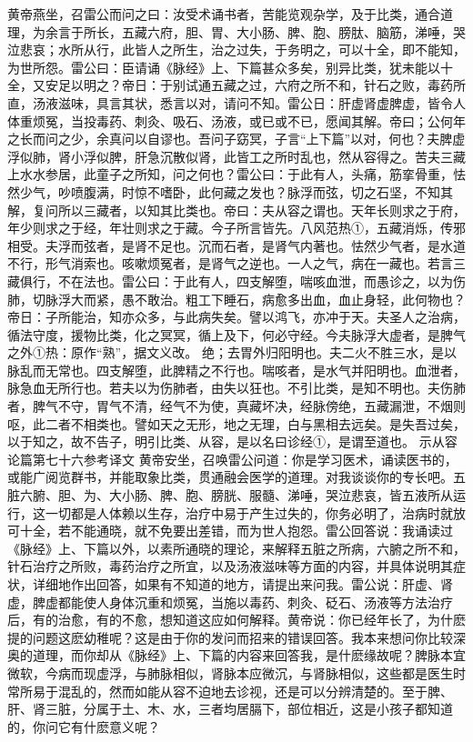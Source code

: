 \documentclass[a4paper,12pt,UTF8,twoside]{ctexbook}
\begin{document}
黄帝燕坐，召雷公而问之曰：汝受术诵书者，苦能览观杂学，及于比类，通合道理，为余言于所长，五藏六府，胆、胃、大小肠、脾、胞、膀肽、脑筋，涕唾，哭泣悲哀；水所从行，此皆人之所生，治之过失，于务明之，可以十全，即不能知，为世所怨。雷公曰：臣请诵《脉经》上、下篇甚众多矣，别异比类，犹未能以十全，又安足以明之？帝日：于别试通五藏之过，六府之所不和，针石之败，毒药所直，汤液滋味，具言其状，悉言以对，请问不知。雷公日：肝虚肾虚脾虚，皆令人体重烦冤，当投毒药、刺灸、吸石、汤液，或已或不已，愿闻其解。帝曰；公何年之长而问之少，余真问以自谬也。吾问子窈冥，子言“上下篇”以对，何也？夫脾虚浮似肺，肾小浮似脾，肝急沉散似肾，此皆工之所时乱也，然从容得之。苦夫三藏上水水参居，此童子之所知，问之何也？雷公曰：于此有人，头痛，筋挛骨重，怯然少气，吵喷腹满，时惊不嗜卧，此何藏之发也？脉浮而弦，切之石坚，不知其解，复问所以三藏者，以知其比类也。帝曰：夫从容之谓也。天年长则求之于府，年少则求之于经，年壮则求之于藏。今子所言皆先。八风范热①，五藏消烁，传邪相受。夫浮而弦者，是肾不足也。沉而石者，是肾气内著也。怯然少气者，是水道不行，形气消索也。咳嗽烦冤者，是肾气之逆也。一人之气，病在一藏也。若言三藏俱行，不在法也。雷公曰：于此有人，四支解堕，喘咳血泄，而愚诊之，以为伤肺，切脉浮大而紧，愚不敢治。粗工下睡石，病愈多出血，血止身轻，此何物也？帝日：子所能治，知亦众多，与此病失矣。譬以鸿飞，亦冲于天。夫圣人之治病，循法守度，援物比类，化之冥冥，循上及下，何必守经。今夫脉浮大虚者，是脾气之外①热：原作“熟”，据文义改。
绝；去胃外归阳明也。夫二火不胜三水，是以脉乱而无常也。四支解堕，此脾精之不行也。喘咳者，是水气并阳明也。血泄者，脉急血无所行也。若夫以为伤肺者，由失以狂也。不引比类，是知不明也。夫伤肺者，脾气不守，胃气不清，经气不为使，真藏坏决，经脉傍绝，五藏漏泄，不烟则呕，此二者不相类也。譬如天之无形，地之无理，白与黑相去远矣。是失吾过矣，以于知之，故不告子，明引比类、从容，是以名曰诊经①，是谓至道也。
示从容论篇第七十六参考译文
黄帝安坐，召唤雷公问道：你是学习医术，诵读医书的，或能广阅览群书，并能取象比类，贯通融会医学的道理。对我谈谈你的专长吧。五脏六腑、胆、为、大小肠、脾、胞、膀胱、服髓、涕唾，哭泣悲哀，皆五液所从运行，这一切都是人体赖以生存，治疗中易于产生过失的，你务必明了，治病时就放可十全，若不能通晓，就不免要出差错，而为世人抱怨。雷公回答说：我诵读过《脉经》上、下篇以外，以素所通晓的理论，来解释五脏之所病，六腑之所不和，针石治疗之所败，毒药治疗之所宜，以及汤液滋味等方面的内容，并具体说明其症状，详细地作出回答，如果有不知道的地方，请提出来问我。雷公说：肝虚、肾虚，脾虚都能使人身体沉重和烦冤，当施以毒药、刺灸、砭石、汤液等方法治疗后，有的治愈，有的不愈，想知道这应如何解释。黄帝说：你已经年长了，为什麽提的问题这麽幼稚呢？这是由于你的发问而招来的错误回答。我本来想问你比较深奥的道理，而你却从《脉经》上、下篇的内容来回答我，是什麽缘故呢？脾脉本宜微软，今病而现虚浮，与肺脉相似，肾脉本应微沉，与肾脉相似，这些都是医生时常所易于混乱的，然而如能从容不迫地去诊视，还是可以分辨清楚的。至于脾、肝、肾三脏，分属于土、木、水，三者均居膈下，部位相近，这是小孩子都知道的，你问它有什麽意义呢？
\end{document}
